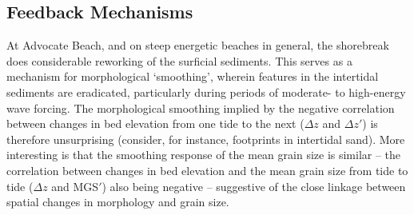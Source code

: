 \subsection{Feedback Mechanisms} %

At Advocate Beach, and on steep energetic beaches in general, the shorebreak does considerable reworking of the surficial sediments. This serves as a mechanism for morphological `smoothing', wherein features in the intertidal sediments are eradicated, particularly during periods of moderate- to high-energy wave forcing. The morphological smoothing implied by the negative correlation between changes in bed elevation from one tide to the next ($\Delta z$ and $\Delta z'$) is therefore unsurprising (consider, for instance, footprints in intertidal sand). More interesting is that the smoothing response of the mean grain size is similar -- the correlation between changes in bed elevation and the mean grain size from tide to tide ($\Delta z$ and MGS$'$) also being negative -- suggestive of the close linkage between spatial changes in morphology and grain size.


